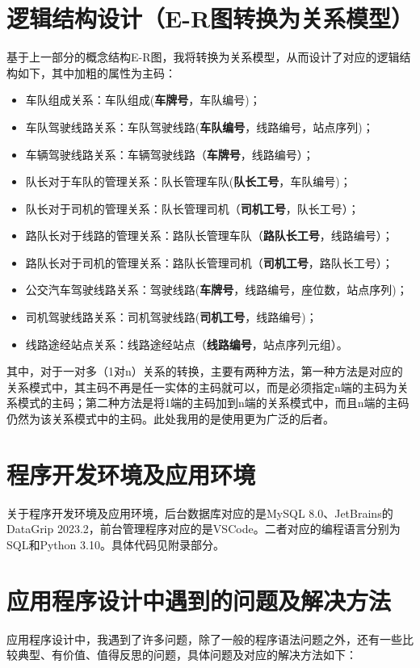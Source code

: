 \documentclass {article}
\begin{document}
	\section{逻辑结构设计（E-R图转换为关系模型）}
		基于上一部分的概念结构E-R图，我将转换为关系模型，从而设计了对应的逻辑结构如下，其中加粗的属性为主码：
		\begin{itemize}
			\item 车队组成关系：车队组成(\textbf{车牌号}，车队编号)；
			\item 车队驾驶线路关系：车队驾驶线路(\textbf{车队编号}，线路编号，站点序列)；
			\item 车辆驾驶线路关系：车辆驾驶线路（\textbf{车牌号}，线路编号）；
			\item 队长对于车队的管理关系：队长管理车队(\textbf{队长工号}，车队编号)；
			\item 队长对于司机的管理关系：队长管理司机（\textbf{司机工号}，队长工号）；
			\item 路队长对于线路的管理关系：路队长管理车队（\textbf{路队长工号}，线路编号）；
			\item 路队长对于司机的管理关系：路队长管理司机（\textbf{司机工号}，路队长工号）；
			\item 公交汽车驾驶线路关系：驾驶线路(\textbf{车牌号}，线路编号，座位数，站点序列)；
			\item 司机驾驶线路关系：司机驾驶线路(\textbf{司机工号}，线路编号)；
			\item 线路途经站点关系：线路途经站点（\textbf{线路编号}，站点序列元组）。
		\end{itemize}
		其中，对于一对多（1对n）关系的转换，主要有两种方法，第一种方法是对应的关系模式中，其主码不再是任一实体的主码就可以，而是必须指定n端的主码为关系模式的主码；第二种方法是将1端的主码加到n端的关系模式中，而且n端的主码仍然为该关系模式中的主码。此处我用的是使用更为广泛的后者。
	
	\section{程序开发环境及应用环境}
		关于程序开发环境及应用环境，后台数据库对应的是MySQL 8.0、JetBrains的DataGrip 2023.2，前台管理程序对应的是VSCode。二者对应的编程语言分别为SQL和Python 3.10。具体代码见附录部分。
	
	\section{应用程序设计中遇到的问题及解决方法}
		应用程序设计中，我遇到了许多问题，除了一般的程序语法问题之外，还有一些比较典型、有价值、值得反思的问题，具体问题及对应的解决方法如下：
		
\end{document}

